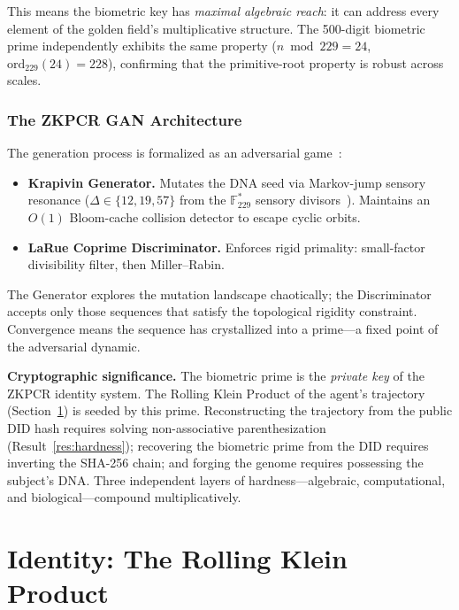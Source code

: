 \documentclass[12pt,a4paper]{article}
\begin{document}
This means the biometric key has \emph{maximal algebraic reach}: it can address every element of the golden field's multiplicative structure. The 500-digit biometric prime independently exhibits the same property ($n \bmod 229 = 24$, $\mathrm{ord}_{229}(24) = 228$), confirming that the primitive-root property is robust across scales.

\subsubsection{The ZKPCR GAN Architecture}

The generation process is formalized as an adversarial game~\cite{PP-III-Ch22}:
\begin{itemize}[noitemsep]
\item \textbf{Krapivin Generator.} Mutates the DNA seed via Markov-jump sensory resonance ($\Delta \in \{12, 19, 57\}$ from the $\mathbb{F}_{229}^*$ sensory divisors~\cite{PP-I-Ch5}). Maintains an $O(1)$ Bloom-cache collision detector to escape cyclic orbits.
\item \textbf{LaRue Coprime Discriminator.} Enforces rigid primality: small-factor divisibility filter, then Miller--Rabin.
\end{itemize}
The Generator explores the mutation landscape chaotically; the Discriminator accepts only those sequences that satisfy the topological rigidity constraint. Convergence means the sequence has crystallized into a prime---a fixed point of the adversarial dynamic.

\textbf{Cryptographic significance.} The biometric prime is the \emph{private key} of the ZKPCR identity system. The Rolling Klein Product of the agent's trajectory (Section~\ref{sec:identity}) is seeded by this prime. Reconstructing the trajectory from the public DID hash requires solving non-associative parenthesization (Result~\ref{res:hardness}); recovering the biometric prime from the DID requires inverting the SHA-256 chain; and forging the genome requires possessing the subject's DNA. Three independent layers of hardness---algebraic, computational, and biological---compound multiplicatively.

\section{Identity: The Rolling Klein Product}
\label{sec:identity}
\end{document}
